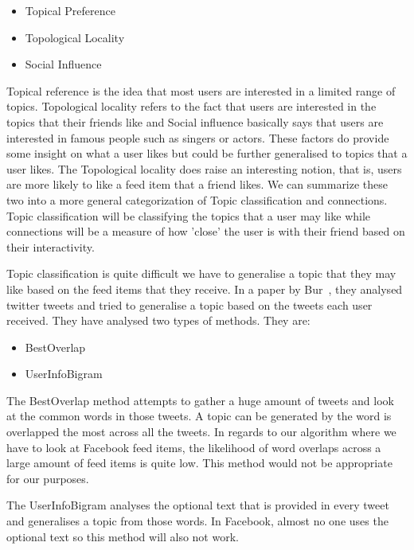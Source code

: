 \begin{itemize}
\item Topical Preference
\item Topological Locality
\item Social Influence
\end{itemize}

Topical reference is the idea that most users are interested in a limited range of topics. Topological locality refers to the fact that users are interested in the topics that their friends like and Social influence basically says that users are interested in famous people such as singers or actors. These factors do provide some insight on what a user likes but could be further generalised to topics that a user likes. The Topological locality does raise an interesting notion, that is, users are more likely to like a feed item that a friend likes. We can summarize these two into a more general categorization of Topic classification and connections. Topic classification will be classifying the topics that a user may like while connections will be a measure of how 'close' the user is with their friend based on their interactivity.

Topic classification is quite difficult we have to generalise a topic that they may like based on the feed items that they receive. In a paper by Bur~\cite{Bur2013}, they analysed twitter tweets and tried to generalise a topic based on the tweets each user received. They have analysed two types of methods. They are:
\begin{itemize}
\item BestOverlap
\item UserInfoBigram
\end{itemize}

The BestOverlap method attempts to gather a huge amount of tweets and look at the common words in those tweets. A topic can be generated by the word is overlapped the most across all the tweets. In regards to our algorithm where we have to look at Facebook feed items, the likelihood of word overlaps across a large amount of feed items is quite low. This method would not be appropriate for our purposes.

The UserInfoBigram analyses the optional text that is provided in every tweet and generalises a topic from those words. In Facebook, almost no one uses the optional text so this method will also not work.

